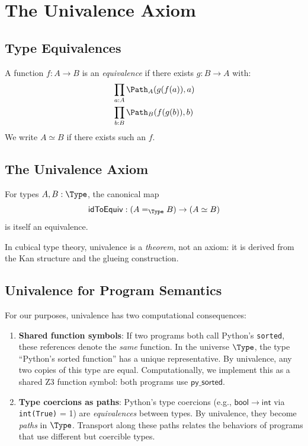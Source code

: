 
\chapter{The Univalence Axiom}
\label{ch:univalence}

\section{Type Equivalences}

\begin{definition}
A function $f : A \to B$ is an \emph{equivalence} if there exists
$g : B \to A$ with:
\begin{align}
  &\prod_{a : A} \Path_A(g(f(a)), a) \\
  &\prod_{b : B} \Path_B(f(g(b)), b)
\end{align}
We write $A \simeq B$ if there exists such an $f$.
\end{definition}

\section{The Univalence Axiom}

\begin{axiom}[Univalence]
\label{ax:univalence}
For types $A, B : \Type$, the canonical map
\[
  \mathsf{idToEquiv} : (A =_\Type B) \to (A \simeq B)
\]
is itself an equivalence.
\end{axiom}

In cubical type theory, univalence is a \emph{theorem}, not an axiom:
it is derived from the Kan structure and the glueing construction.

\section{Univalence for Program Semantics}

For our purposes, univalence has two computational consequences:

\begin{enumerate}
  \item \textbf{Shared function symbols}: If two programs both call
    Python's \texttt{sorted}, these references denote the \emph{same}
    function.  In the universe $\Type$, the type ``Python's sorted
    function'' has a unique representative.  By univalence, any two
    copies of this type are equal.  Computationally, we implement this
    as a shared Z3 function symbol: both programs use
    $\mathsf{py\_sorted}$.

  \item \textbf{Type coercions as paths}: Python's type coercions
    (e.g., $\mathsf{bool} \to \mathsf{int}$ via \texttt{int(True)} = 1)
    are \emph{equivalences} between types.  By univalence, they become
    \emph{paths} in $\Type$.  Transport along these paths relates
    the behaviors of programs that use different but coercible types.
\end{enumerate}

